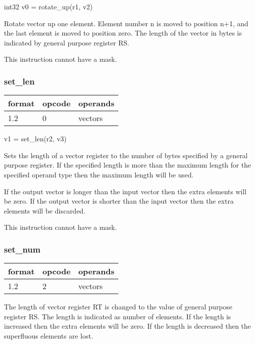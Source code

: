 \documentclass[forwardcom.tex]{subfiles}
\begin{document}
int32 v0 = rotate\_up(r1, v2)
\vspace{2mm}

Rotate vector up one element. Element number n is moved to position n+1, and the last element is moved to position zero. The length of the vector in bytes is indicated by general purpose register RS.
\vspace{2mm}

This instruction cannot have a mask.


\subsubsection{set\_len}
\label{table:setLenInstruction}
\begin{tabular}{|p{12mm}|p{12mm}|p{110mm}|}
\hline
\bfseries format & \bfseries opcode & \bfseries operands \\ \hline
1.2 & 0 & vectors \\ \hline
\end{tabular}
\vspace{2mm}

v1 = set\_len(r2, v3)
\vspace{2mm}

Sets the length of a vector register to the number of bytes specified by a general purpose register. If the specified length is more than the maximum length for the specified operand type then the maximum length will be used.
\vspace{2mm}

If the output vector is longer than the input vector then the extra elements will be zero. If the output vector is shorter than the input vector then the extra elements will be discarded. 
\vspace{2mm}

This instruction cannot have a mask.


\subsubsection{set\_num}
\label{table:setNumInstruction}
\begin{tabular}{|p{12mm}|p{12mm}|p{110mm}|}
\hline
\bfseries format & \bfseries opcode & \bfseries operands \\ \hline
1.2 & 2 & vectors \\ \hline
\end{tabular}
\vspace{2mm}

The length of vector register RT is changed to the value of general purpose register RS. The length is indicated as number of elements. If the length is increased then the extra elements will be zero. If the length is decreased then the superfluous elements are lost.
\end{document}
